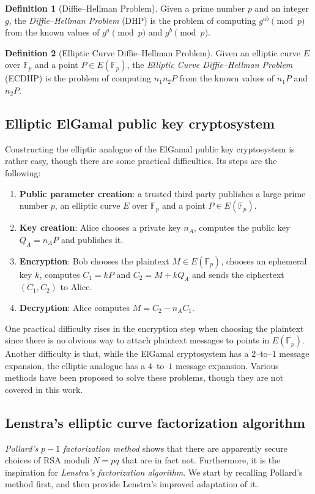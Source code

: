 \documentclass[9pt]{article}
\theoremstyle{definition}
\newtheorem{definition}{Definition}[section]
\begin{document}
\begin{definition}[Diffie--Hellman Problem]
Given a prime number $p$ and an integer $g$, the \textit{Diffie--Hellman Problem} (DHP) is the problem of computing $g^{ab} \pmod{p}$ from the known values of $g^{a} \pmod{p}$ and $g^{b} \pmod{p}$.
\end{definition}

\begin{definition}[Elliptic Curve Diffie--Hellman Problem]
Given an elliptic curve $E$ over $\mathbb{F}_p$ and a point $P \in E(\mathbb{F}_p)$, the \textit{Elliptic Curve Diffie--Hellman Problem} (ECDHP) is the problem of computing $n_1 n_2 P$ from the known values of $n_1 P$ and $n_2 P$.
\end{definition}

\subsection{Elliptic ElGamal public key cryptosystem}
Constructing the elliptic analogue of the ElGamal public key cryptosystem is rather easy, though there are some practical difficulties. Its steps are the following:
\begin{enumerate}[label=\textbf{\arabic*.}]
    \item \textbf{Public parameter creation}: a trusted third party publishes a large prime number $p$, an elliptic curve $E$ over $\mathbb{F}_p$ and a point $P \in E(\mathbb{F}_p)$.
    \item \textbf{Key creation}: Alice chooses a private key $n_A$, computes the public key $Q_A = n_AP$ and publishes it.
    \item \textbf{Encryption}: Bob chooses the plaintext $M \in E(\mathbb{F}_p)$, chooses an ephemeral key $k$, computes $C_1 = kP$ and $C_2 = M + kQ_A$ and sends the ciphertext $(C_1, C_2)$ to Alice.
    \item \textbf{Decryption}: Alice computes $M = C_2 - n_AC_1$.
\end{enumerate}

One practical difficulty rises in the encryption step when choosing the plaintext since there is no obvious way to attach plaintext messages to points in $E(\mathbb{F}_p)$. Another difficulty is that, while the ElGamal cryptosystem has a $2$--to--$1$ message expansion, the elliptic analogue has a $4$--to--$1$ message expansion. Various methods have been proposed to solve these problems, though they are not covered in this work.

\subsection{Lenstra's elliptic curve factorization algorithm}
\textit{Pollard's} $p-1$ \textit{factorization method} shows that there are apparently secure choices of RSA moduli $N = pq$ that are in fact not. Furthermore, it is the inspiration for \textit{Lenstra's factorization algorithm}. We start by recalling Pollard's method first, and then provide Lenstra's improved adaptation of it.
\end{document}
